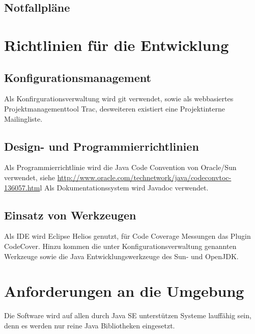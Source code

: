 \documentclass[a4paper,10pt]{scrartcl}
\begin{document}
\subsection{Notfallpläne}

\section{Richtlinien für die Entwicklung}
\subsection{Konfigurationsmanagement}
Als Konfirgurationsverwaltung wird git verwendet, sowie als webbasiertes Projektmanagementtool Trac, desweiteren existiert eine Projektinterne
Mailingliste.
\subsection{Design- und Programmierrichtlinien}
Als Programmierrichtlinie wird die Java Code Convention von Oracle/Sun verwendet, siehe \url{http://www.oracle.com/technetwork/java/codeconvtoc-136057.htm}l
Als Dokumentationssystem wird Javadoc verwendet.
\subsection{Einsatz von Werkzeugen}
Als IDE wird Eclipse Helios genutzt, für Code Coverage Messungen das Plugin CodeCover. Hinzu kommen die unter Konfigurationsverwaltung genannten
Werkzeuge sowie die Java Entwicklungswerkzeuge des Sun- und OpenJDK.
\section{Anforderungen an die Umgebung}
Die Software wird auf allen durch Java SE unterstützen Systeme lauffähig sein, denn es werden nur reine Java Bibliotheken eingesetzt.
\end{document}
